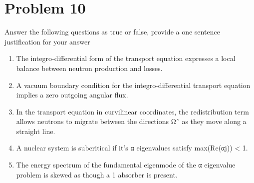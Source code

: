 \documentclass{article}
\begin{document}

\section*{Problem 10}

Answer the following questions as true or false, provide a one sentence justification for your answer\\
\begin{enumerate}
\item The integro-differential form of the transport equation expresses a local balance between neutron production and losses.
\item A vacuum boundary condition for the integro-differential transport equation implies a zero outgoing angular flux.
\item In the transport equation in curvilinear coordinates, the redistribution term allows neutrons to migrate between the directions Ωˆ as they move along a straight line.
\item A nuclear system is subcritical if it’s α eigenvalues satisfy max(Re(αj)) < 1.
\item The energy spectrum of the fundamental eigenmode of the α eigenvalue problem is skewed as though a 1 absorber is present.
\end{enumerate}




\end{document}
